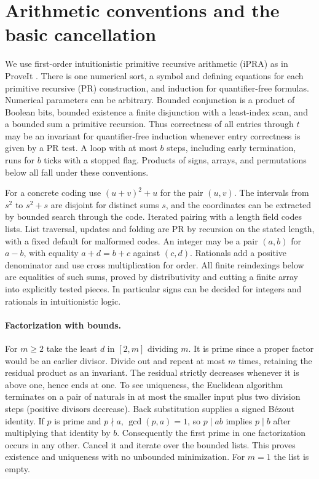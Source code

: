 \section{Arithmetic conventions and the basic cancellation}\label{sec:foundation}

We use first-order intuitionistic primitive recursive arithmetic (iPRA) as in ProveIt \cite{repo}. There is one numerical sort, a symbol and defining equations for each primitive recursive (PR) construction, and induction for quantifier-free formulas. Numerical parameters can be arbitrary. Bounded conjunction is a product of Boolean bits, bounded existence a finite disjunction with a least-index scan, and a bounded sum a primitive recursion. Thus correctness of all entries through $t$ may be an invariant for quantifier-free induction whenever entry correctness is given by a PR test. A loop with at most $b$ steps, including early termination, runs for $b$ ticks with a stopped flag. Products of signs, arrays, and permutations below all fall under these conventions.

For a concrete coding use $(u+v)^2+u$ for the pair $(u,v)$. The intervals from $s^2$ to $s^2+s$ are disjoint for distinct sums $s$, and the coordinates can be extracted by bounded search through the code. Iterated pairing with a length field codes lists. List traversal, updates and folding are PR by recursion on the stated length, with a fixed default for malformed codes. An integer may be a pair $(a,b)$ for $a-b$, with equality $a+d=b+c$ against $(c,d)$. Rationals add a positive denominator and use cross multiplication for order. All finite reindexings below are equalities of such sums, proved by distributivity and cutting a finite array into explicitly tested pieces. In particular signs can be decided for integers and rationals in intuitionistic logic.

\paragraph{Factorization with bounds.}
For $m\ge2$ take the least $d$ in $[2,m]$ dividing $m$. It is prime since a proper factor would be an earlier divisor. Divide out and repeat at most $m$ times, retaining the residual product as an invariant. The residual strictly decreases whenever it is above one, hence ends at one. To see uniqueness, the Euclidean algorithm terminates on a pair of naturals in at most the smaller input plus two division steps (positive divisors decrease). Back substitution supplies a signed B\'ezout identity. If $p$ is prime and $p\nmid a$, $\gcd(p,a)=1$, so $p\mid ab$ implies $p\mid b$ after multiplying that identity by $b$. Consequently the first prime in one factorization occurs in any other. Cancel it and iterate over the bounded lists. This proves existence and uniqueness with no unbounded minimization. For $m=1$ the list is empty.

